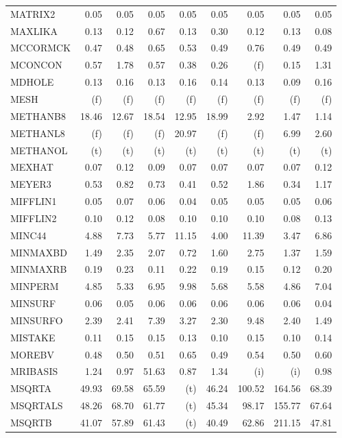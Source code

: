 \documentclass[11pt,twoside]{article}
\begin{document}
{\begin{longtable}[c]{|l|r|r|r|r|r|r|r|r|}
MATRIX2 & 0.05 & 0.05 & 0.05 & 0.05 & 0.05 & 0.05 & 0.05 & 0.05 \\
MAXLIKA & 0.13 & 0.12 & 0.67 & 0.13 & 0.30 & 0.12 & 0.13 & 0.08 \\
MCCORMCK & 0.47 & 0.48 & 0.65 & 0.53 & 0.49 & 0.76 & 0.49 & 0.49 \\
MCONCON & 0.57 & 1.78 & 0.57 & 0.38 & 0.26 & (f) & 0.15 & 1.31 \\
MDHOLE & 0.13 & 0.16 & 0.13 & 0.16 & 0.14 & 0.13 & 0.09 & 0.16 \\
MESH & (f) & (f) & (f) & (f) & (f) & (f) & (f) & (f) \\
METHANB8 & 18.46 & 12.67 & 18.54 & 12.95 & 18.99 & 2.92 & 1.47 & 1.14 \\
METHANL8 & (f) & (f) & (f) & 20.97 & (f) & (f) & 6.99 & 2.60 \\
METHANOL & (t) & (t) & (t) & (t) & (t) & (t) & (t) & (t) \\
MEXHAT & 0.07 & 0.12 & 0.09 & 0.07 & 0.07 & 0.07 & 0.07 & 0.12 \\
MEYER3 & 0.53 & 0.82 & 0.73 & 0.41 & 0.52 & 1.86 & 0.34 & 1.17 \\
MIFFLIN1 & 0.05 & 0.07 & 0.06 & 0.04 & 0.05 & 0.05 & 0.05 & 0.06 \\
MIFFLIN2 & 0.10 & 0.12 & 0.08 & 0.10 & 0.10 & 0.10 & 0.08 & 0.13 \\
MINC44 & 4.88 & 7.73 & 5.77 & 11.15 & 4.00 & 11.39 & 3.47 & 6.86 \\
MINMAXBD & 1.49 & 2.35 & 2.07 & 0.72 & 1.60 & 2.75 & 1.37 & 1.59 \\
MINMAXRB & 0.19 & 0.23 & 0.11 & 0.22 & 0.19 & 0.15 & 0.12 & 0.20 \\
MINPERM & 4.85 & 5.33 & 6.95 & 9.98 & 5.68 & 5.58 & 4.86 & 7.04 \\
MINSURF & 0.06 & 0.05 & 0.06 & 0.06 & 0.06 & 0.06 & 0.06 & 0.04 \\
MINSURFO & 2.39 & 2.41 & 7.39 & 3.27 & 2.30 & 9.48 & 2.40 & 1.49 \\
MISTAKE & 0.11 & 0.15 & 0.15 & 0.13 & 0.10 & 0.15 & 0.10 & 0.14 \\
MOREBV & 0.48 & 0.50 & 0.51 & 0.65 & 0.49 & 0.54 & 0.50 & 0.60 \\
MRIBASIS & 1.24 & 0.97 & 51.63 & 0.87 & 1.34 & (i) & (i) & 0.98 \\
MSQRTA & 49.93 & 69.58 & 65.59 & (t) & 46.24 & 100.52 & 164.56 & 68.39 \\
MSQRTALS & 48.26 & 68.70 & 61.77 & (t) & 45.34 & 98.17 & 155.77 & 67.64 \\
MSQRTB & 41.07 & 57.89 & 61.43 & (t) & 40.49 & 62.86 & 211.15 & 47.81 \\

\end{longtable}}
\end{document}
